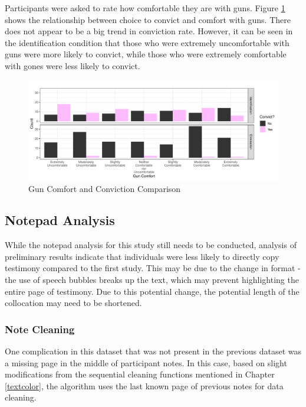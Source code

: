 \documentclass[print]{nuthesis}
\begin{document}
Participants were asked to rate how comfortable they are with guns.
Figure \ref{fig:convictscomfort} shows the relationship between choice to convict and comfort with guns.
There does not appear to be a big trend in conviction rate.
However, it can be seen in the identification condition that those who were extremely uncomfortable with guns were more likely to convict, while those who were extremely comfortable with gones were less likely to convict.

\begin{figure}

{\centering \includegraphics[width=\linewidth]{thesis_files/figure-latex/convictscomfort-1} 

}

\caption{Gun Comfort and Conviction Comparison}\label{fig:convictscomfort}
\end{figure}

\hypertarget{notepad-analysis}{%
\subsection{Notepad Analysis}\label{notepad-analysis}}

While the notepad analysis for this study still needs to be conducted, analysis of preliminary results indicate that individuals were less likely to directly copy testimony compared to the first study.
This may be due to the change in format - the use of speech bubbles breaks up the text, which may prevent highlighting the entire page of testimony.
Due to this potential change, the potential length of the collocation may need to be shortened.

\hypertarget{note-cleaning}{%
\subsubsection{Note Cleaning}\label{note-cleaning}}

One complication in this dataset that was not present in the previous dataset was a missing page in the middle of participant notes.
In this case, based on slight modifications from the sequential cleaning functions mentioned in Chapter \ref{textcolor}, the algorithm uses the last known page of previous notes for data cleaning.
\end{document}
